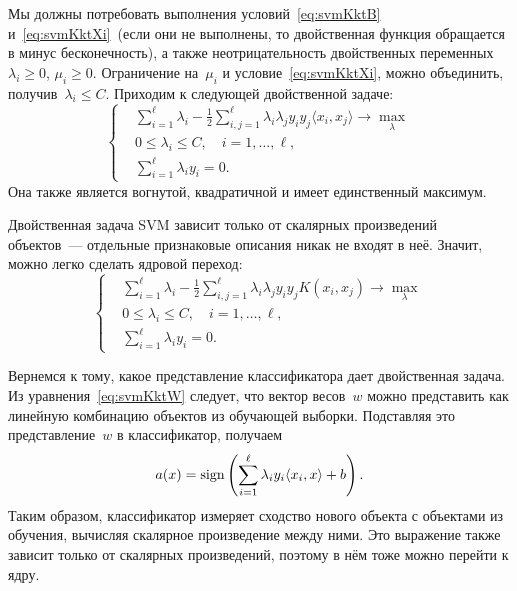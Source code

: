 \documentclass[12pt,fleqn]{article}
\begin{document}
Мы должны потребовать выполнения условий~\eqref{eq:svmKktB}
и~\eqref{eq:svmKktXi}~(если они не выполнены,
то двойственная функция обращается в минус бесконечность),
а также неотрицательность двойственных
переменных~$\lambda_i \geq 0$, $\mu_i \geq 0$.
Ограничение на~$\mu_i$ и условие~\eqref{eq:svmKktXi},
можно объединить, получив~$\lambda_i \leq C$.
Приходим к следующей двойственной задаче:
\begin{equation}
\label{eq:svmDual}
    \left\{
        \begin{aligned}
            & \sum_{i = 1}^{\ell}
                \lambda_i
            -
            \frac{1}{2} \sum_{i, j = 1}^{\ell}
                \lambda_i \lambda_j y_i y_j \langle x_i, x_j \rangle
            \to \max_{\lambda} \\
            & 0 \leq \lambda_i \leq C, \quad i = 1, \dots, \ell, \\
            & \sum_{i = 1}^{\ell} \lambda_i y_i = 0.
        \end{aligned}
    \right.
\end{equation}
Она также является вогнутой, квадратичной и имеет единственный максимум.

Двойственная задача SVM зависит только от скалярных произведений объектов~---
отдельные признаковые описания никак не входят в неё.
Значит, можно легко сделать ядровой переход:
\begin{equation}
    \left\{
        \begin{aligned}
            & \sum_{i = 1}^{\ell}
                \lambda_i
            -
            \frac{1}{2} \sum_{i, j = 1}^{\ell}
                \lambda_i \lambda_j y_i y_j K(x_i, x_j)
            \to \max_{\lambda} \\
            & 0 \leq \lambda_i \leq C, \quad i = 1, \dots, \ell, \\
            & \sum_{i = 1}^{\ell} \lambda_i y_i = 0.
        \end{aligned}
    \right.
\end{equation}

Вернемся к тому, какое представление классификатора дает двойственная задача.
Из уравнения~\eqref{eq:svmKktW} следует, что вектор весов~$w$
можно представить как линейную комбинацию объектов из обучающей выборки.
Подставляя это представление~$w$ в классификатор, получаем
\begin{equation}
\label{eq:svmDualClassifier}
    a(x) = \mathop{\rm sign}\limits \left(
        \sum_{i = 1}^{\ell} \lambda_i y_i \langle x_i, x \rangle + b
    \right).
\end{equation}
Таким образом, классификатор измеряет сходство нового объекта
с объектами из обучения, вычисляя скалярное произведение между ними.
Это выражение также зависит только от скалярных произведений,
поэтому в нём тоже можно перейти к ядру.
\end{document}

